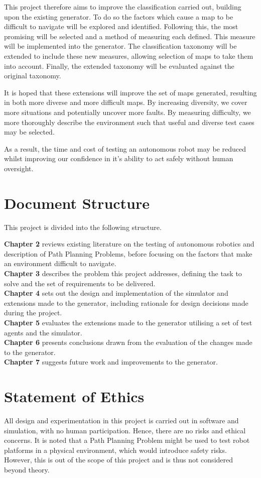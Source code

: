 \documentclass[authoryearcitations]{UoYCSproject}
\begin{document}
This project therefore aims to improve the classification carried out, building upon the existing generator. To do so the factors which cause a map to be difficult to navigate will be explored and identified. Following this, the most promising will be selected and a method of measuring each defined. This measure will be implemented into the generator. The classification taxonomy will be extended to include these new measures, allowing selection of maps to take them into account. Finally, the extended taxonomy will be evaluated against the original taxonomy.

It is hoped that these extensions will improve the set of maps generated, resulting in both more diverse and more difficult maps. By increasing diversity, we cover more situations and potentially uncover more faults. By measuring difficulty, we more thoroughly describe the environment such that useful and diverse test cases may be selected.

As a result, the time and cost of testing an autonomous robot may be reduced whilst improving our confidence in it's ability to act safely without human oversight.

\section{Document Structure}
\label{sec:DocStruct}
This project is divided into the following structure.

\textbf{Chapter 2} reviews existing literature on the testing of autonomous robotics and description of Path Planning Problems, before focusing on the factors that make an environment difficult to navigate.\\
\textbf{Chapter 3} describes the problem this project addresses, defining the task to solve and the set of requirements to be delivered.\\
\textbf{Chapter 4} sets out the design and implementation of the simulator and extensions made to the generator, including rationale for design decisions made during the project.\\
\textbf{Chapter 5} evaluates the extensions made to the generator utilising a set of test agents and the simulator.\\
\textbf{Chapter 6} presents conclusions drawn from the evaluation of the changes made to the generator.\\
\textbf{Chapter 7} suggests future work and improvements to the generator.

\section{Statement of Ethics}
\label{sec:Ethics}
All design and experimentation in this project is carried out in software and simulation, with no human participation. Hence, there are no risks and ethical concerns. It is noted that a Path Planning Problem might be used to test robot platforms in a physical environment, which would introduce safety risks. However, this is out of the scope of this project and is thus not considered beyond theory.
\end{document}
